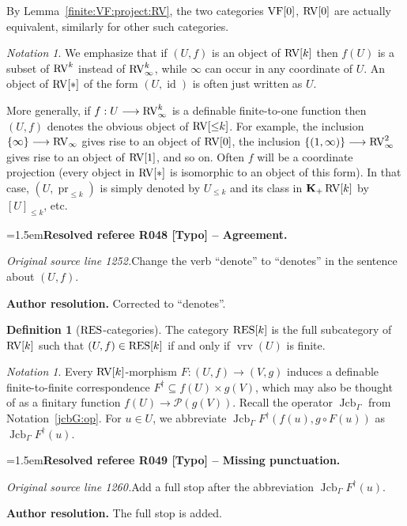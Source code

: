\documentclass[12pt]{amsart}
\newcommand{\ResolvedRefereeRemark}[5]{%
  \par\medskip\begingroup\normalfont\small\color{gray}%
  \emergencystretch=1.5em\noindent\textbf{Resolved referee R#1 [#2] -- #3.}\par\nobreak\noindent #4\par
  \medskip\color{ResolutionGreen}\noindent\textbf{Author resolution.} #5\par
  \endgroup\medskip
}
\theoremstyle{plain}
\theoremstyle{definition}
\newtheorem{defn}[thm]{Definition}
\theoremstyle{remark}
\newtheorem{nota}[thm]{Notation}
\numberwithin{equation}{section}
\theoremstyle{plain}
\newcommand{\VF}{\textup{VF}}
\newcommand{\RV}{\textup{RV}}
\DeclareMathOperator{\id}{id}
\DeclareMathOperator{\pr}{pr}
\DeclareMathOperator{\jcb}{Jcb}
\newcommand{\0}{\emptyset}
\newcommand{\mdl}[1]{\mathcal{#1}}  %
\newcommand{\fun}{\longrightarrow}
\newcommand{\sub}{\subseteq}
\newcommand{\RES}{\textup{RES}}
\DeclareMathOperator{\gsk}{\mathbf{K}_+}
\DeclareMathOperator{\vrv}{vrv}
\begin{document}
By Lemma~\ref{finite:VF:project:RV}, the two categories $\VF[0]$, $\RV[0]$ are actually equivalent, similarly for other such categories.

\begin{nota}\label{0coor}
We emphasize that if $(U, f)$ is an object of $\RV[k]$ then $f(U)$ is a subset of $\RV^k$ instead of $\RV^k_\infty$, while $\infty$ can occur in any coordinate of $U$. An object of  $\RV[*]$ of the form $(U, \id)$ is often just written as $U$.

More generally, if $f : U \fun \RV_\infty^k$ is a definable finite-to-one function then $(U, f)$ denotes the obvious object of $\RV[{\leq} k]$. For example, the inclusion $\{\infty\} \fun \RV_{\infty}$ gives rise to an object of $\RV[0]$, the inclusion $\{(1, \infty)\} \fun \RV_{\infty}^2$ gives rise to an object of $\RV[1]$, and so on. Often $f$ will be a coordinate projection (every object in $\RV[*]$ is isomorphic to an object of this form). In that case, $(U, \pr_{\leq k})$ is simply denoted by $U_{\leq k}$ and its class in $\gsk \RV[k]$ by $[U]_{\leq k}$, etc.

\ResolvedRefereeRemark{048}{Typo}{Agreement}{%
\textit{Original source line 1252.}\quad Change the verb ``denote'' to ``denotes'' in the sentence about $(U,f)$.
}{Corrected to ``denotes''.}
\end{nota}

\begin{defn}[$\RES$-categories]\label{defn:RES:cat}
The category $\RES[k]$ is the full subcategory of $\RV[k]$ such that $(U, f) \in \RES[k]$ if and only if $\vrv(U)$ is finite.
\end{defn}

\begin{nota}\label{mor:ftf}
Every $\RV[k]$-morphism $F: (U, f) \fun (V, g)$  induces a definable finite-to-finite correspondence $F^\dag \sub f(U) \times g(V)$, which may also be thought of as a finitary function $f(U) \fun \mdl P(g(V))$. Recall the operator $\jcb_{\Gamma}$ from Notation~\ref{jcbG:op}. For $ u \in U$, we abbreviate $\jcb_{\Gamma}  F^\dag(f(u), g \circ F(u))$ as $\jcb_{\Gamma}  F^\dag(u)$.

\ResolvedRefereeRemark{049}{Typo}{Missing punctuation}{%
\textit{Original source line 1260.}\quad Add a full stop after the abbreviation $\jcb_{\Gamma}F^\dag(u)$.
}{The full stop is added.}
\end{nota}
\end{document}
